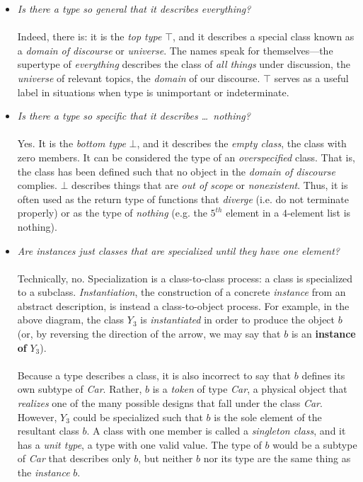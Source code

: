 \begin{itemize}
	\item \textit{Is there a type so general that it describes everything?} \\\\	
	Indeed, there is: it is the \textit{top type} $\top$, and it describes a special class known as a \textit{domain of discourse} or \textit{universe}. The names speak for themselves---the supertype of \textit{everything} describes the class of \textit{all things} under discussion, the \textit{universe} of relevant topics, the \textit{domain} of our discourse. $\top$ serves as a useful label in situations when type is unimportant or indeterminate.
	\item \textit{Is there a type so specific that it describes \dots\ nothing?} \\\\
	Yes. It is the \textit{bottom type} $\bot$, and it describes the \textit{empty class}, the class with zero members. It can be considered the type of an \textit{overspecified} class. That is, the class has been defined such that no object in the \textit{domain of discourse} complies. $\bot$ describes things that are \textit{out of scope} or \textit{nonexistent}. Thus, it is often used as the return type of functions that \textit{diverge} (i.e. do not terminate properly) or as the type of \textit{nothing} (e.g. the $5^{th}$ element in a $4$-element list is nothing).
	\item \textit{Are instances just classes that are specialized until they have one element?} \\\\
	Technically, no. Specialization is a class-to-class process: a class is specialized to a subclass. \textit{Instantiation}, the construction of a concrete \textit{instance} from an abstract description, is instead a class-to-object process. For example, in the above diagram, the class $Y_3$ is \textit{instantiated} in order to produce the object $b$ (or, by reversing the direction of the arrow, we may say that $b$ is an \textbf{instance of} $Y_3$). \\\\
	Because a type describes a class, it is also incorrect to say that $b$ defines its own subtype of \textit{Car}. Rather, $b$ is a \textit{token} of type \textit{Car}, a physical object that \textit{realizes} one of the many possible designs that fall under the class \textit{Car}. However, $Y_3$ could be specialized such that $b$ is the sole element of the resultant class ${b}$. A class with one member is called a \textit{singleton class}, and it has a \textit{unit type}, a type with one valid value. The type of ${b}$ would be a subtype of \textit{Car} that describes only $b$, but neither ${b}$ nor its type are the same thing as the \textit{instance} $b$. \\
\end{itemize}

